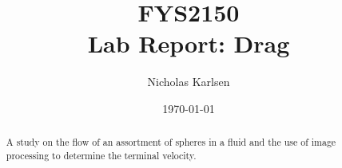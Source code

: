 \documentclass[11pt,a4paper]{article}
\begin{document}

\title{FYS2150 \\ Lab Report: Drag}%

\author{Nicholas Karlsen}

\date{\today}%

\maketitle

\begin{abstract}
  A study on the flow of an assortment of spheres in a fluid and the use of image processing to determine the terminal velocity.
\end{abstract}

\end{document}
